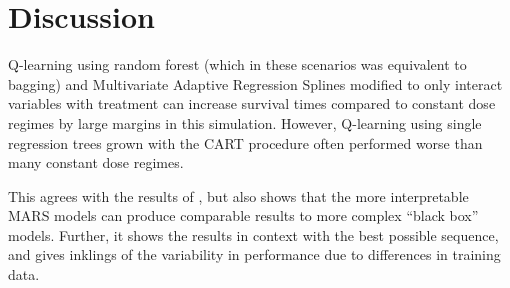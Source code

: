\documentclass[12pt]{article}
\begin{document}
% 

\section{Discussion} %
\label{sec:discussion}


Q-learning using random forest (which in these scenarios was equivalent to bagging) and Multivariate Adaptive Regression Splines modified to only interact variables with treatment can increase survival times compared to constant dose regimes by large margins in this simulation. However, Q-learning using single regression trees grown with the CART procedure often performed worse than many constant dose regimes.

This agrees with the results of \textcite{crt}, but also shows that the more interpretable MARS models can produce comparable results to more complex ``black box'' models. Further, it shows the results in context with the best possible sequence, and gives inklings of the variability in performance due to differences in training data.
\end{document}

